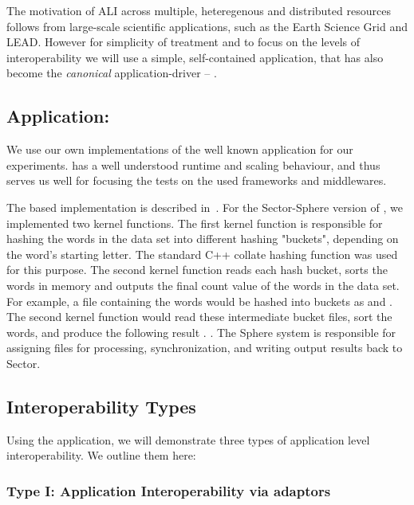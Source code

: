 \documentclass[3p,twocolumn]{elsarticle}
\begin{document}
The motivation of ALI across multiple, heteregenous and distributed
resources follows from large-scale scientific applications, such as
the Earth Science Grid and LEAD. However for simplicity of treatment
and to focus on the levels of interoperability we will use a simple,
self-contained application, that has also become the {\it canonical}
\mr application-driver -- \wc.

\subsection{Application: \Wc}
\label{ssec:app}

We use our own implementations of the well known \wc application for
our experiments.  \Wc has a well understood runtime and scaling
behaviour, and thus serves us well for focusing the tests on the used
frameworks and middlewares.

The \mr based \wc implementation is described in~\cite{saga_ccgrid09}.
For the Sector-Sphere version of \wc, we implemented two kernel
functions. The first kernel function is responsible for hashing the
words in the data set into different hashing "buckets", depending on
the word's starting letter.  The standard C++ collate hashing function
was used for this purpose.  The second kernel function reads each hash
bucket, sorts the words in memory and outputs the final count value of
the words in the data set.  For example, a file containing the words
 would be hashed into buckets as
 and .  The second kernel
function would read these intermediate bucket files, sort the words,
and produce the following result .  .  The Sphere system is responsible for assigning files for
processing, synchronization, and writing output results back to
Sector.

\subsection{Interoperability Types}

Using the \wc application, we will demonstrate three types of
application level interoperability. We outline them here:


\subsubsection{Type I: Application Interoperability via adaptors}
%
%
\end{document}
